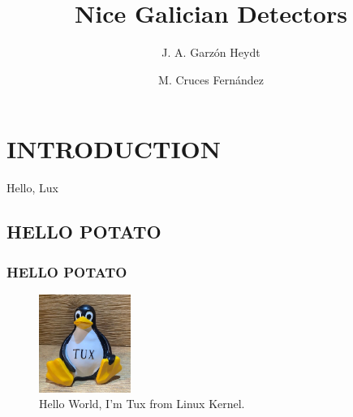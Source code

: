 \documentclass[a4paper, onseide, 12pt]{article}
\begin{document}
\title{Nice Galician Detectors}

\author[1]{J. A. Garzón Heydt}
\author[2]{M. Cruces Fernández}



\maketitle 

%
%  
%  
%  
%    
%  
%  
%  	
%  
%  
%  


\section{INTRODUCTION}
Hello, Lux
\subsection{HELLO POTATO}

\subsubsection{HELLO POTATO}
\begin{figure}[!h]
  \centering
  \includegraphics[width=3cm]{tux.jpg}
  \caption{Hello World, I'm Tux from Linux Kernel.}  \label{fig:xray}
\end{figure}
\end{document}
